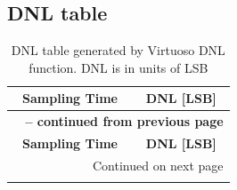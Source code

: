 \documentclass[english, 12pt, a4paper]{ifimaster}
\begin{document}
\begin{appendices}
\chapter{DNL table}


\begin{center}
\begin{longtable}[htbp]{|c|c|}
\caption{DNL table generated by Virtuoso DNL function. DNL is in units of LSB}\label{table:data:dnl}\\
\hline 
\multicolumn{1}{|c|}{\textbf{Sampling Time}}  &
\multicolumn{1}{c|}{\textbf{DNL [LSB]}}  \\
\hline 
\endfirsthead
\multicolumn{2}{c}{{\bfseries \tablename\ \thetable{} -- continued from previous page}} \\
\hline
\multicolumn{1}{|c|}{\textbf{Sampling Time}}  &
\multicolumn{1}{c|}{\textbf{DNL [LSB]}}  \\
\hline 
\endhead

\hline \multicolumn{2}{|r|}{{Continued on next page}} \\ \hline
\endfoot


\end{longtable}
\end{center}
\end{appendices}
\end{document}
